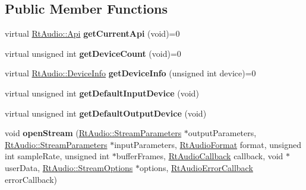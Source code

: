 \subsection*{Public Member Functions}
\begin{DoxyCompactItemize}
\item 
virtual \hyperlink{class_rt_audio_ac9b6f625da88249d08a8409a9db0d849}{Rt\+Audio\+::\+Api} {\bfseries get\+Current\+Api} (void)=0\hypertarget{class_rt_api_aace5faa22a1615993d038c7acb37dbf4}{}\label{class_rt_api_aace5faa22a1615993d038c7acb37dbf4}

\item 
virtual unsigned int {\bfseries get\+Device\+Count} (void)=0\hypertarget{class_rt_api_a4efee04d90b46722e80fce09cd72dfb3}{}\label{class_rt_api_a4efee04d90b46722e80fce09cd72dfb3}

\item 
virtual \hyperlink{struct_rt_audio_1_1_device_info}{Rt\+Audio\+::\+Device\+Info} {\bfseries get\+Device\+Info} (unsigned int device)=0\hypertarget{class_rt_api_a62787b01c30a6addb243cd7da794dfdc}{}\label{class_rt_api_a62787b01c30a6addb243cd7da794dfdc}

\item 
virtual unsigned int {\bfseries get\+Default\+Input\+Device} (void)\hypertarget{class_rt_api_a6178ebc0e78bfdd277d7fedf7b88d44f}{}\label{class_rt_api_a6178ebc0e78bfdd277d7fedf7b88d44f}

\item 
virtual unsigned int {\bfseries get\+Default\+Output\+Device} (void)\hypertarget{class_rt_api_afbe763b59fb7a3d346eb0c95945950c7}{}\label{class_rt_api_afbe763b59fb7a3d346eb0c95945950c7}

\item 
void {\bfseries open\+Stream} (\hyperlink{struct_rt_audio_1_1_stream_parameters}{Rt\+Audio\+::\+Stream\+Parameters} $\ast$output\+Parameters, \hyperlink{struct_rt_audio_1_1_stream_parameters}{Rt\+Audio\+::\+Stream\+Parameters} $\ast$input\+Parameters, \hyperlink{_rt_audio_8h_aafca92882d25915560018873221e44b8}{Rt\+Audio\+Format} format, unsigned int sample\+Rate, unsigned int $\ast$buffer\+Frames, \hyperlink{_rt_audio_8h_aa96e52a4e057d224cda0c39926e5c652}{Rt\+Audio\+Callback} callback, void $\ast$user\+Data, \hyperlink{struct_rt_audio_1_1_stream_options}{Rt\+Audio\+::\+Stream\+Options} $\ast$options, \hyperlink{_rt_audio_8h_a255b480e1e3c2818d838fb12d13f3123}{Rt\+Audio\+Error\+Callback} error\+Callback)\hypertarget{class_rt_api_a5db36650d77680d2af18ab0b6ff2f3a9}{}\label{class_rt_api_a5db36650d77680d2af18ab0b6ff2f3a9}


\end{DoxyCompactItemize}
